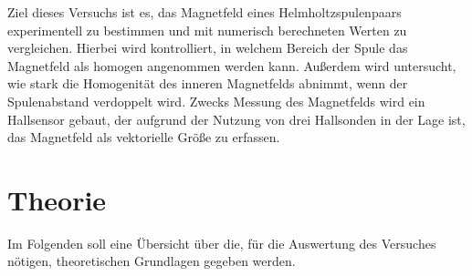 \documentclass[12pt,a4paper]{article}
\begin{document}
Ziel dieses Versuchs ist es, das Magnetfeld eines Helmholtzspulenpaars experimentell zu bestimmen und mit numerisch berechneten Werten zu vergleichen. Hierbei wird kontrolliert, in welchem Bereich der Spule das Magnetfeld als homogen angenommen werden kann. Außerdem wird untersucht, wie stark die Homogenität des inneren Magnetfelds abnimmt, wenn der Spulenabstand verdoppelt wird. Zwecks Messung des Magnetfelds wird ein Hallsensor gebaut, der aufgrund der Nutzung von drei Hallsonden in der Lage ist, das Magnetfeld als vektorielle Größe zu erfassen.


\section{Theorie}
Im Folgenden soll eine Übersicht über die, für die Auswertung des Versuches nötigen, theoretischen Grundlagen gegeben werden.
\end{document}

